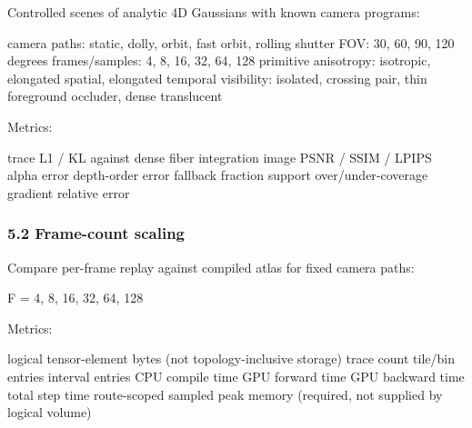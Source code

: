 \documentclass[
]{article}
\newenvironment{Shaded}{}{}
\newcommand{\NormalTok}[1]{#1}
\begin{document}
Controlled scenes of analytic 4D Gaussians with known camera programs:

\begin{Shaded}
\begin{Highlighting}[]
\NormalTok{camera paths: static, dolly, orbit, fast orbit, rolling shutter}
\NormalTok{FOV: 30, 60, 90, 120 degrees}
\NormalTok{frames/samples: 4, 8, 16, 32, 64, 128}
\NormalTok{primitive anisotropy: isotropic, elongated spatial, elongated temporal}
\NormalTok{visibility: isolated, crossing pair, thin foreground occluder, dense translucent}
\end{Highlighting}
\end{Shaded}

Metrics:

\begin{Shaded}
\begin{Highlighting}[]
\NormalTok{trace L1 / KL against dense fiber integration}
\NormalTok{image PSNR / SSIM / LPIPS}
\NormalTok{alpha error}
\NormalTok{depth{-}order error}
\NormalTok{fallback fraction}
\NormalTok{support over/under{-}coverage}
\NormalTok{gradient relative error}
\end{Highlighting}
\end{Shaded}

\subsubsection{5.2 Frame-count scaling}\label{frame-count-scaling}

Compare per-frame replay against compiled atlas for fixed camera paths:

\begin{Shaded}
\begin{Highlighting}[]
\NormalTok{F = 4, 8, 16, 32, 64, 128}
\end{Highlighting}
\end{Shaded}

Metrics:

\begin{Shaded}
\begin{Highlighting}[]
\NormalTok{logical tensor{-}element bytes (not topology{-}inclusive storage)}
\NormalTok{trace count}
\NormalTok{tile/bin entries}
\NormalTok{interval entries}
\NormalTok{CPU compile time}
\NormalTok{GPU forward time}
\NormalTok{GPU backward time}
\NormalTok{total step time}
\NormalTok{route{-}scoped sampled peak memory (required, not supplied by logical volume)}
\end{Highlighting}
\end{Shaded}
\end{document}

